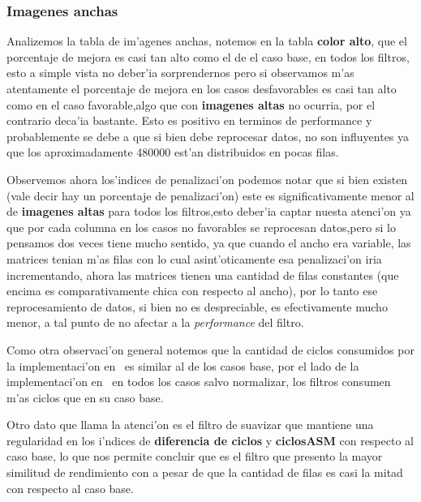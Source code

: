\subsubsection{Imagenes anchas}
Analizemos la tabla de im'agenes anchas, notemos en la tabla \textbf{color alto}, que el porcentaje de mejora es
casi tan alto como el de el caso base, en todos los filtros, esto a simple vista no deber'ia
 sorprendernos pero si observamos m'as atentamente el porcentaje de mejora en los casos desfavorables es 
casi tan alto como en el caso favorable,algo que con \textbf{imagenes altas} no ocurria, por el contrario
deca'ia bastante. Esto es positivo en terminos de performance y probablemente se debe a que si bien
debe reprocesar datos, no son influyentes ya que los aproximadamente 480000 est'an distribuidos en
pocas filas.

Observemos ahora los'indices de penalizaci'on podemos notar que si bien existen (vale decir hay un porcentaje
 de penalizaci'on) este es significativamente menor al de \textbf{imagenes altas} para todos los filtros,esto
deber'ia captar nuesta atenci'on ya que por cada columna en los casos no favorables se reprocesan datos,pero
si lo pensamos dos veces tiene mucho sentido, ya que cuando el ancho era variable, las matrices
tenian m'as filas con lo cual asint'oticamente esa penalizaci'on iria incrementando, ahora las matrices
tienen una cantidad de filas constantes (que encima es comparativamente chica con respecto al ancho),
por lo tanto ese reprocesamiento de datos, si bien no es despreciable, es efectivamente mucho menor,
a tal punto de no afectar a la \textit{performance} del filtro.

Como otra observaci'on general notemos que la cantidad de ciclos consumidos por la implementaci'on en \C \ es
similar al de los casos base, por el lado de la implementaci'on en \ass \ en todos los casos salvo normalizar,
los filtros consumen m'as ciclos que en su caso base.

Otro dato que llama la atenci'on es el filtro de suavizar que mantiene una regularidad en los i'ndices de 
\textbf{diferencia de ciclos} y \textbf{ciclosASM} con respecto al caso base, lo que nos permite concluir que es el filtro que
presento la mayor similitud de rendimiento con a pesar de que la cantidad de filas es casi la mitad con respecto al caso
base.



